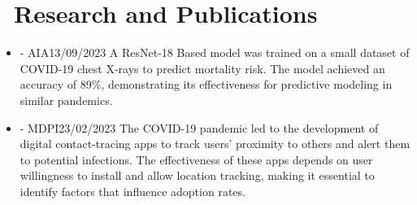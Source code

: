 \section{\texorpdfstring{\faSearch}{}\ Research and Publications}


\begin{itemize}[parsep=0.8ex]
      \item  \textbf{} - AIA\hspace*{0pt}\hfill {13/09/2023}
            \newline A ResNet-18 Based model was trained on a small dataset of COVID-19 chest X-rays to predict mortality risk. The model achieved an accuracy of 89\%, demonstrating its effectiveness for predictive modeling in similar pandemics.


      \item \textbf{} - MDPI\hspace*{0pt}\hfill {23/02/2023}
            \newline The COVID-19 pandemic led to the development of digital contact-tracing apps to track users' proximity to others and alert them to potential infections. The effectiveness of these apps depends on user willingness to install and allow location tracking, making it essential to identify factors that influence adoption rates.
\end{itemize}